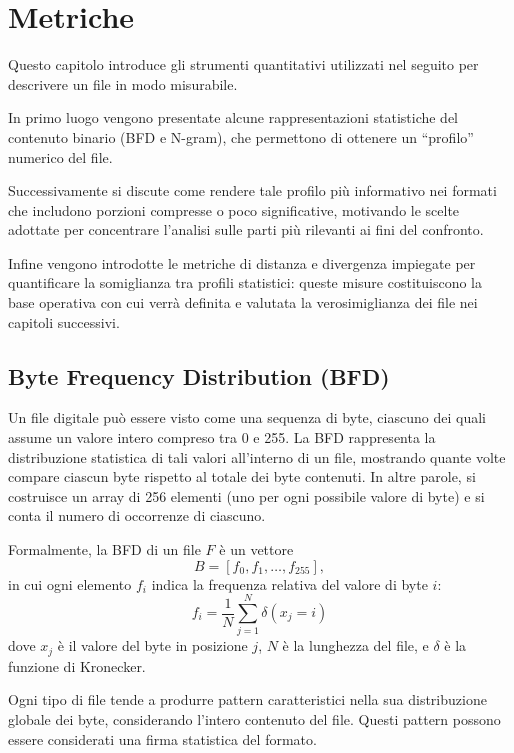 \documentclass{report}
\begin{document}
\chapter{Metriche}

Questo capitolo introduce gli strumenti quantitativi utilizzati nel seguito per
descrivere un file in modo misurabile.

\bigskip

In primo luogo vengono presentate alcune rappresentazioni statistiche del contenuto binario
(BFD e N-gram), che permettono di ottenere un “profilo” numerico del file.

\bigskip

Successivamente si discute come rendere tale profilo più informativo nei formati che includono
porzioni compresse o poco significative, motivando le scelte adottate per concentrare l’analisi
sulle parti più rilevanti ai fini del confronto.

\bigskip

Infine vengono introdotte le metriche di distanza e divergenza impiegate per
quantificare la somiglianza tra profili statistici: queste misure costituiscono la base operativa
con cui verrà definita e valutata la verosimiglianza dei file nei capitoli successivi.

\section{Byte Frequency Distribution (BFD)}

Un file digitale può essere visto come una sequenza di byte, ciascuno dei quali assume un valore intero compreso tra 0 e 255.
La BFD rappresenta la distribuzione statistica di tali valori all’interno di un file, mostrando quante volte compare ciascun byte rispetto al totale dei byte contenuti.
In altre parole, si costruisce un array di 256 elementi (uno per ogni possibile valore di byte) e si conta il numero di occorrenze di ciascuno.

Formalmente, la BFD di un file $F$ è un vettore
\[
B = [f_0, f_1, \dots, f_{255}],
\]
in cui ogni elemento $f_i$ indica la frequenza relativa del valore di byte $i$:
\[
f_i = \frac{1}{N} \sum_{j=1}^{N} \delta(x_j = i)
\]
dove $x_j$ è il valore del byte in posizione $j$, $N$ è la lunghezza del file, e $\delta$ è la funzione di Kronecker.
\bigskip

Ogni tipo di file tende a produrre pattern caratteristici nella sua distribuzione globale dei byte, considerando l'intero contenuto del file.
Questi pattern possono essere considerati una firma statistica del formato.
\end{document}
